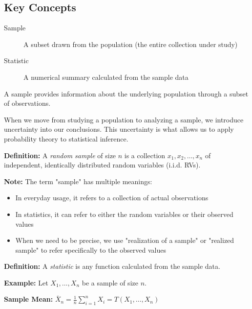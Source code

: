 \documentclass{article}
\begin{document}
    \subsection*{Key Concepts}
    \begin{description}
        \item[Sample] A subset drawn from the population (the entire collection under study)
        \item[Statistic] A numerical summary calculated from the sample data
    \end{description}

    \begin{center}
    \end{center}

    A sample provides information about the underlying population through a subset of observations.

    When we move from studying a population to analyzing a sample, we introduce uncertainty into our conclusions. This uncertainty is what allows us to apply probability theory to statistical inference.

    \textbf{Definition:} A \emph{random sample} of size $n$ is a collection $x_1, x_2, \ldots, x_n$ of independent, identically distributed random variables (i.i.d. RVs).

    \textbf{Note:} The term "sample" has multiple meanings:
    \begin{itemize}
        \item In everyday usage, it refers to a collection of actual observations
        \item In statistics, it can refer to either the random variables or their observed values
        \item When we need to be precise, we use "realization of a sample" or "realized sample" to refer specifically to the observed values
    \end{itemize}

    \textbf{Definition:} A \emph{statistic} is any function calculated from the sample data.

    \textbf{Example:} Let $X_1, \ldots, X_n$ be a sample of size $n$.

    \textbf{Sample Mean:} $\bar{X}_n = \frac{1}{n}\sum_{i=1}^n X_i = T(X_1, \ldots, X_n)$
\end{document}
